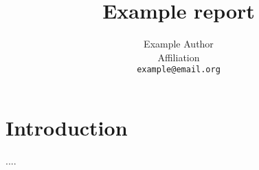 \documentclass[a4paper,11pt]{article}
\title{Example report}
\date{}
\author{Example Author\\
       Affiliation\\
       \texttt{example@email.org}
}
\begin{document}
\maketitle
\thispagestyle{empty}
\pagestyle{empty}

\section{Introduction}

....



\end{document}

